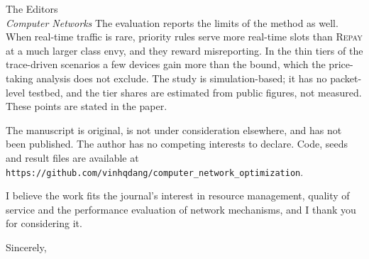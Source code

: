 \documentclass[11pt]{letter}
\begin{document}
\begin{letter}{The Editors\\\textit{Computer Networks}}
The evaluation reports the limits of the method as well. When real-time traffic is rare, priority rules serve more real-time slots than \textsc{Repay} at a much larger class envy, and they reward misreporting. In the thin tiers of the trace-driven scenarios a few devices gain more than the bound, which the price-taking analysis does not exclude. The study is simulation-based; it has no packet-level testbed, and the tier shares are estimated from public figures, not measured. These points are stated in the paper.

The manuscript is original, is not under consideration elsewhere, and has not been published. The author has no competing interests to declare. Code, seeds and result files are available at \texttt{https://github.com/vinhqdang/computer\_network\_optimization}.

I believe the work fits the journal's interest in resource management, quality of service and the performance evaluation of network mechanisms, and I thank you for considering it.

\closing{Sincerely,}
\end{letter}
\end{document}
